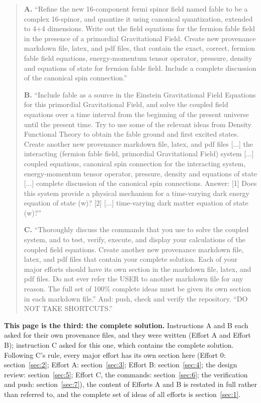 \begin{quote}
\textbf{A.} ``Refine the new 16-component fermi spinor field named fable to be a complex 16-spinor, and quantize it using canonical quantization, extended to 4+4 dimensions. Write out the field equations for the fermion fable field in the presence of a primordial Gravitational Field. Create new provenance markdown file, latex, and pdf files, that contain the exact, correct, fermion fable field equations, energy-momentum tensor operator, pressure, density and equations of state for fermion fable field. Include a complete discussion of the canonical spin connection.''

\textbf{B.} ``Include fable as a source in the Einstein Gravitational Field Equations for this primordial Gravitational Field, and solve the coupled field equations over a time interval from the beginning of the present universe until the present time. Try to use some of the relevant ideas from Density Functional Theory to obtain the fable ground and first excited states. Create another new provenance markdown file, latex, and pdf files [...] the interacting (fermion fable field, primordial Gravitational Field) system [...] coupled equations, canonical spin connection for the interacting system, energy-momentum tensor operator, pressure, density and equations of state [...] complete discussion of the canonical spin connections. Answer: [1] Does this system provide a physical mechanism for a time-varying dark energy equation of state (w)? [2] [...] time-varying dark matter equation of state (w)?''

\textbf{C.} ``Thoroughly discuss the commands that you use to solve the coupled system, and to test, verify, execute, and display your calculations of the coupled field equations. Create another new provenance markdown file, latex, and pdf files that contain your complete solution. Each of your major efforts should have its own section in the markdown file, latex, and pdf files. Do not ever refer the USER to another markdown file for any reason. The full set of 100\% complete ideas must be given its own section in each markdown file.'' And: push, check and verify the repository. ``DO NOT TAKE SHORTCUTS.''
\end{quote}

\textbf{This page is the third: the complete solution.} Instructions A and B each asked for their own provenance files, and they were written (Effort A and Effort B); instruction C asked for this one, which contains the complete solution. Following C's rule, every major effort has its own section here (Effort 0: section~\ref{sec:2}; Effort A: section~\ref{sec:3}; Effort B: section~\ref{sec:4}; the design review: section~\ref{sec:5}; Effort C, the commands: section~\ref{sec:6}; the verification and push: section~\ref{sec:7}), the content of Efforts A and B is restated in full rather than referred to, and the complete set of ideas of all efforts is section~\ref{sec:1}.


